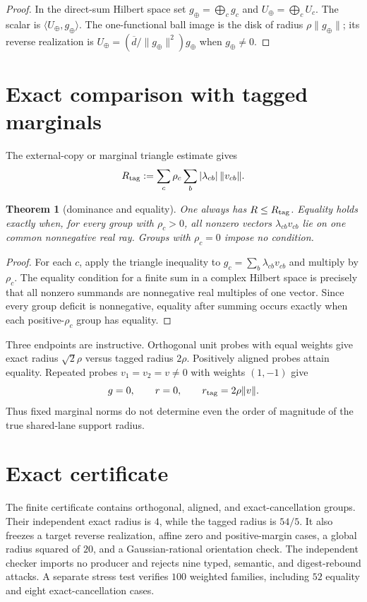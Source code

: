 \documentclass[11pt]{article}
\newtheorem{theorem}{Theorem}[section]
\theoremstyle{remark}
\begin{document}
\begin{proof}
In the direct-sum Hilbert space set $g_\oplus=\bigoplus_cg_c$ and
$U_\oplus=\bigoplus_cU_c$.  The scalar is
$\langle U_\oplus,g_\oplus\rangle$.  The one-functional ball image is the
disk of radius $\rho\|g_\oplus\|$; its reverse realization is
$U_\oplus=(\overline{d}/\|g_\oplus\|^2)g_\oplus$ when $g_\oplus\neq0$.
\end{proof}

\section{Exact comparison with tagged marginals}

The external-copy or marginal triangle estimate gives
\[
 R_{\rm tag}:=\sum_c\rho_c\sum_b|\lambda_{cb}|\,\|v_{cb}\|.
\]

\begin{theorem}[dominance and equality]\label{thm:equality}
One always has $R\leq R_{\rm tag}$.  Equality holds exactly when, for every
group with $\rho_c>0$, all nonzero vectors $\lambda_{cb}v_{cb}$ lie on one
common nonnegative real ray.  Groups with $\rho_c=0$ impose no condition.
\end{theorem}

\begin{proof}
For each $c$, apply the triangle inequality to
$g_c=\sum_b\lambda_{cb}v_{cb}$ and multiply by $\rho_c$.  The equality
condition for a finite sum in a complex Hilbert space is precisely that all
nonzero summands are nonnegative real multiples of one vector.  Since every
group deficit is nonnegative, equality after summing occurs exactly when each
positive-$\rho_c$ group has equality.
\end{proof}

Three endpoints are instructive.  Orthogonal unit probes with equal weights
give exact radius $\sqrt2\rho$ versus tagged radius $2\rho$.  Positively aligned
probes attain equality.  Repeated probes $v_1=v_2=v\neq0$ with weights
$(1,-1)$ give
\[
 g=0,\qquad r=0,\qquad r_{\rm tag}=2\rho\|v\|.
\]
Thus fixed marginal norms do not determine even the order of magnitude of the
true shared-lane support radius.

\section{Exact certificate}

The finite certificate contains orthogonal, aligned, and exact-cancellation
groups.  Their independent exact radius is $4$, while the tagged radius is
$54/5$.  It also freezes a target reverse realization, affine zero and
positive-margin cases, a global radius squared of $20$, and a
Gaussian-rational orientation check.  The independent checker imports no
producer and rejects nine typed, semantic, and digest-rebound attacks.  A
separate stress test verifies $100$ weighted families, including $52$ equality
and eight exact-cancellation cases.
\end{document}
